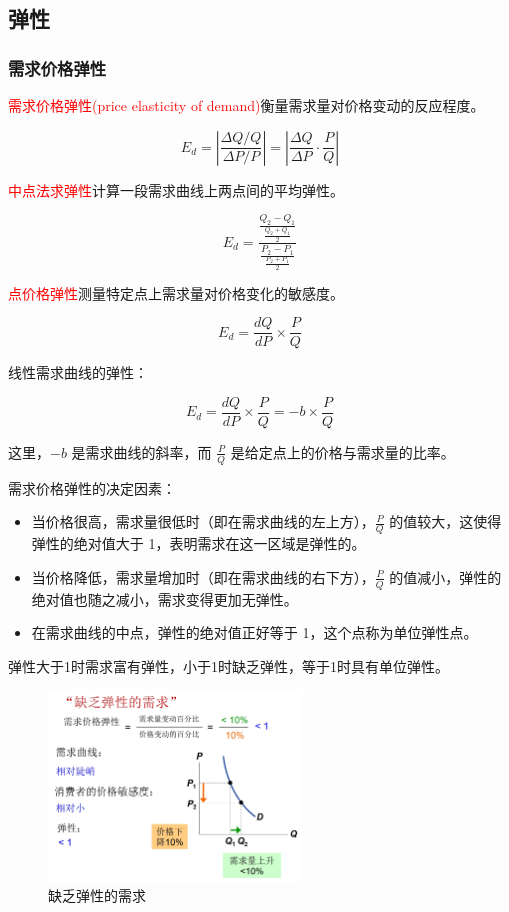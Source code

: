 \documentclass[12pt, a4paper]{article}
\begin{document}
\subsection{弹性}

\subsubsection{需求价格弹性}
\textcolor{red}{需求价格弹性(price elasticity of demand)}衡量需求量对价格变动的反应程度。

\[ E_d = \left| \frac{\Delta Q / Q}{\Delta P / P} \right| = \left| \frac{\Delta Q}{\Delta P} \cdot \frac{P}{Q} \right| \]

\textcolor{red}{中点法求弹性}计算一段需求曲线上两点间的平均弹性。

\[ E_d = \frac{\frac{Q_2 - Q_1}{\frac{Q_2 + Q_1}{2}}}{\frac{P_2 - P_1}{\frac{P_2 + P_1}{2}}} \]

\textcolor{red}{点价格弹性}测量特定点上需求量对价格变化的敏感度。

\[ E_d = \frac{dQ}{dP} \times \frac{P}{Q} \]

线性需求曲线的弹性：

\[ E_d = \frac{dQ}{dP} \times \frac{P}{Q} = -b \times \frac{P}{Q} \]

这里，$-b$ 是需求曲线的斜率，而 $\frac{P}{Q}$ 是给定点上的价格与需求量的比率。

需求价格弹性的决定因素：
\begin{itemize}
  \item 当价格很高，需求量很低时（即在需求曲线的左上方），$\frac{P}{Q}$ 的值较大，这使得弹性的绝对值大于 1，表明需求在这一区域是弹性的。
  \item 当价格降低，需求量增加时（即在需求曲线的右下方），$\frac{P}{Q}$ 的值减小，弹性的绝对值也随之减小，需求变得更加无弹性。
  \item 在需求曲线的中点，弹性的绝对值正好等于 1，这个点称为单位弹性点。
\end{itemize}

弹性大于1时需求富有弹性，小于1时缺乏弹性，等于1时具有单位弹性。

\begin{figure}[H]
  \centering
  \includegraphics[width=0.6\textwidth]{缺乏弹性的需求.png}
  \caption{缺乏弹性的需求}
\end{figure}
\end{document}
